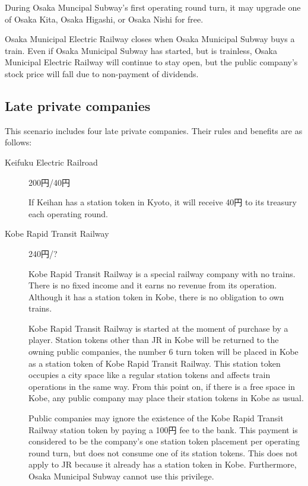 \documentclass{article}
\begin{document}
\begin{CJK}{UTF8}{min}
\begin{multicols}{2}
\begin{description}
  During Osaka Muncipal Subway's first operating round turn, it may
  upgrade one of Osaka Kita, Osaka Higashi, or Osaka Nishi for free.

  Osaka Municipal Electric Railway closes when Osaka Municipal Subway
  buys a train. Even if Osaka Municipal Subway has started, but is
  trainless, Osaka Municipal Electric Railway will continue to stay
  open, but the public company's stock price will fall due to
  non-payment of dividends.
\end{description}

\subsection{Late private companies}

This scenario includes four late private companies. Their rules and
benefits are as follows:

\begin{description}
\item[Keifuku Electric Railroad] \hfill 200円/40円

  If Keihan has a station token in Kyoto, it will receive 40円 to
  its treasury each operating round.

\item[Kobe Rapid Transit ​​Railway] \hfill 240円/? \label{kobe}

  Kobe Rapid Transit Railway is a special railway company with no
  trains. There is no fixed income and it earns no revenue from its
  operation. Although it has a station token in Kobe, there is no
  obligation to own trains.

  Kobe Rapid Transit Railway is started at the moment of purchase by a
  player. Station tokens other than JR in Kobe will be returned to the
  owning public companies, the number 6 turn token will be placed in
  Kobe as a station token of Kobe Rapid Transit Railway. This station
  token occupies a city space like a regular station tokens and
  affects train operations in the same way. From this point on, if
  there is a free space in Kobe, any public company may place their
  station tokens in Kobe as usual.

  Public companies may ignore the existence of the Kobe Rapid Transit
  Railway station token by paying a 100円 fee to the bank. This
  payment is considered to be the company's one station token
  placement per operating round turn, but does not consume one of its
  station tokens. This does not apply to JR because it already has a
  station token in Kobe. Furthermore, Osaka Municipal Subway cannot
  use this privilege.


\end{description}
\end{multicols}
\end{CJK}
\end{document}

